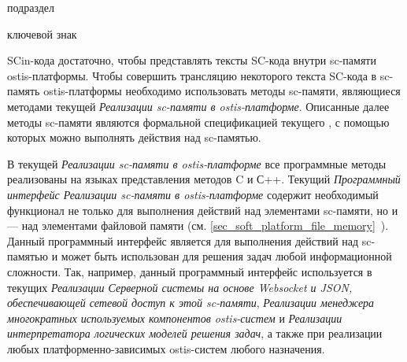 \begin{SCn}

\begin{scnrelfromlist}{подраздел}
\end{scnrelfromlist}

\begin{scnrelfromlist}{ключевой знак}
\end{scnrelfromlist}
	
\end{SCn}

\bigskip

SCin-кода достаточно, чтобы представлять тексты SC-кода внутри sc-памяти ostis-платформы. Чтобы совершить трансляцию некоторого текста SC-кода в sc-память ostis-платформы необходимо использовать методы sc-памяти, являющиеся методами текущей \textit{Реализации sc-памяти в ostis-платформе}. Описанные далее методы sc-памяти являются формальной спецификацией текущего , с помощью которых можно выполнять действия над sc-памятью.

В текущей \textit{Реализации sc-памяти в ostis-платформе} все программные методы реализованы на языках представления методов C и С++. Текущий \textit{Программный интерфейс Реализации sc-памяти в ostis-платформе} содержит необходимый функционал не только для выполнения действий над элементами sc-памяти, но и --- над элементами файловой памяти (см. \ref{sec_soft_platform_file_memory}~). Данный программный интерфейс является   для выполнения действий над sc-памятью и может быть использован для решения задач любой информационной сложности. Так, например, данный программный интерфейс используется в текущих \textit{Реализации Серверной системы на основе Websocket и JSON, обеспечивающей сетевой доступ к этой sc-памяти}, \textit{Реализации менеджера многократных используемых компонентов ostis-систем} и \textit{Реализации интерпретатора логических моделей решения задач}, а также при реализации любых платформенно-зависимых ostis-систем любого назначения.

